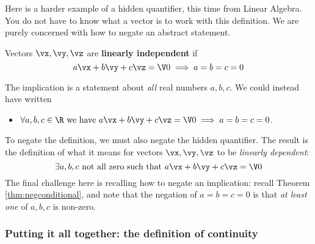 \noindent Here is a harder example of a hidden quantifier, this time from Linear Algebra. You do not have to know what a vector is to work with this definition. We are purely concerned with how to negate an abstract statement.

\begin{defn}
Vectors $\vx,\vy,\vz$ are \textbf{linearly independent} if
\[a\vx+b\vy+c\vz=\V 0\implies a=b=c=0\]
\end{defn}
The implication is a statement about \emph{all} real numbers $a,b,c$. We could instead have written
  \begin{itemize}\setlength{\itemsep}{0pt}
    \item[] $\forall a,b,c\in\R\text{ we have }a\vx+b\vy+c\vz=\V 0\implies a=b=c=0$.
  \end{itemize}
  To negate the definition, we must also negate the hidden quantifier. The result is the definition of what it means for vectors $\vx,\vy,\vz$ to be \emph{linearly dependent}:
    \[\exists a,b,c\text{ not all zero such that }a\vx+b\vy+c\vz=\V 0\]
The final challenge here is recalling how to negate an implication: recall Theorem \ref{thm:negconditional}, and note that the negation of $a=b=c=0$ is that \emph{at least one} of $a,b,c$ is non-zero.






\subsubsection*{Putting it all together: the definition of continuity}

